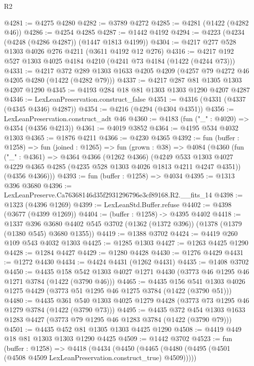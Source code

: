 \begin{lexlean}{R2}
\begin{coremodule}
@4281 := @4275 @4280
@4282 := @3789 @4272
@4285 := @4281 (@1422 (@4282 @46))
@4286 := @4254 @4285
@4287 := @1442 @4192
@4294 := @4223 (@4234 (@4248 (@4286 @4287)) (@1447 @1813 @4199))
@4304 := @4217 @277 @528 @1303 @4026 @276 @4211 (@3611 @4192 @12 @276)
@4316 := @4217 @192 @527 @1303 @4025 @4184 @4210 (@4241 @73 @4184 (@1422 (@4244 @73)))
@4331 := @4217
    @372
    @289
    @1303
    @1633
    @4205
    @4209
    (@4257 @79 @4272 @46 @4205 @4280 (@1422 (@4282 @79)))
@4337 := @4217 @287 @81 @1305 @1303 @4207 @1290
@4345 := @4193 @284 @18 @81 @1303 @1303 @1290 @4207 @4287
@4346 := LexLeanPreservation.construct_false
@4351 := @4316 (@4331 (@4337 (@4345 @4346) @4287))
@4354 := @4216 (@4294 (@4304 @4351))
@4356 := LexLeanPreservation.construct_adt @46
@4360 := @4183 (fun ("_" : @4020) => @4354 (@4356 @4213))
@4361 := @4019 @3852
@4364 := @4195 @534 @4032 @1303
@4365 := @1876 @4211
@4366 := @4230 @4365
@4392 := fun (buffer : @1258) =>
  fun (joined : @1265) =>
  fun (grown : @38) =>
  @4084
    (@4360
      (fun ("_" : @4361) =>
      @4364
        @4366
        (@1262 @4366)
        (@4249 @533 @1303 @4027 @4229 @4365 @4285 (@4235 @528 @1303 @4026 @1813 @4211 @4247 @4351))
        (@4356 @4366)))
@4393 := fun (buffer : @1258) => @4034
@4395 := @1313 @396 @3680
@4396 := LexLeanPreserve.Ca76368146d35f2931296796e3cf89168.R2.__fits_14
@4398 := @1323 (@4396 @1269)
@4399 := LexLeanStd.Buffer.refuse
@4402 := @4398 (@3677 (@4399 @1269))
@4404 := (buffer : @1258) -> @4395 @4402
@4418 := @1337
    @396
    @3680
    @4402
    @545
    @3702
    (@1362 (@1372 @396))
    (@1378 (@1379 (@1380 @545) @3680 @1355))
@4419 := @1388 @3702
@4424 := @4419 @260 @109 @543 @4032 @1303
@4425 := @1285 @1303
@4427 := @1263 @4425 @1290
@4428 := @1284 @4427
@4429 := @1280 @4428
@4430 := @1276 @4429
@4431 := @1272 @4430
@4434 := @4424 @4431 (@1262 @4431)
@4435 := @1408 @3702
@4450 := @4435
    @158
    @542
    @1303
    @4027
    @1271
    @4430
    (@3773 @46 @1295 @46 @1271 @3784 (@1422 (@3790 @46)))
@4465 := @4435
    @156
    @541
    @1303
    @4026
    @1275
    @4429
    (@3773 @51 @1295 @46 @1275 @3784 (@1422 (@3790 @51)))
@4480 := @4435
    @361
    @540
    @1303
    @4025
    @1279
    @4428
    (@3773 @73 @1295 @46 @1279 @3784 (@1422 (@3790 @73)))
@4495 := @4435
    @372
    @454
    @1303
    @1633
    @1283
    @4427
    (@3773 @79 @1295 @46 @1283 @3784 (@1422 (@3790 @79)))
@4501 := @4435 @452 @81 @1305 @1303 @4425 @1290
@4508 := @4419 @449 @18 @81 @1303 @1303 @1290 @4425
@4509 := @1442 @3702
@4523 := fun (buffer : @1258) =>
  @4418
    (@4434
      (@4450 (@4465 (@4480 (@4495 (@4501 (@4508 @4509 LexLeanPreservation.construct_true) @4509)))))

\end{coremodule}
\end{lexlean}
